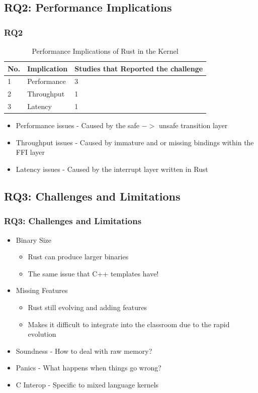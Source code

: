 \documentclass{beamer}
\begin{document}
\subsection{RQ2: Performance Implications}
\begin{frame}
  \frametitle{RQ2}
  \begin{table}
    \caption{Performance Implications of Rust in the Kernel}
    \begin{tabular}{||l|l|l||}
      \hline
      No. & Implication & Studies that Reported the challenge\\
      \hline\hline
      1 & Performance & 3\\
      2 & Throughput & 1\\
      3 & Latency & 1 \\
      \hline
    \end{tabular}
    \label{tab:RQ2}
  \end{table}

  \begin{itemize}
  \item Performance issues - Caused by the safe $->$ unsafe transition layer
  \item Throughput issues - Caused by immature and or missing bindings within the FFI layer
  \item Latency issues - Caused by the interrupt layer written in Rust
  \end{itemize}

\end{frame}


\subsection{RQ3: Challenges and Limitations}
\begin{frame}
  \frametitle{RQ3: Challenges and Limitations}
  \begin{itemize}
  \item<1-> Binary Size
    \begin{itemize}
    \item Rust can produce larger binaries
    \item The same issue that C++ templates have!
    \end{itemize}
  \item<2-> Missing Features
    \begin{itemize}
    \item Rust still evolving and adding features
    \item Makes it difficult to integrate into the classroom due to the rapid evolution
    \end{itemize}
  \item<3-> Soundness - How to deal with raw memory?
  \item<4-> Panics - What happens when things go wrong?
  \item<5-> C Interop - Specific to mixed language kernels
  \end{itemize}
\end{frame}
\end{document}
